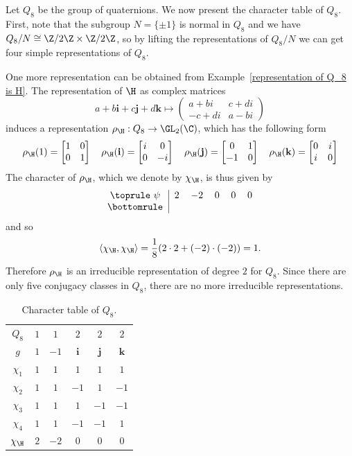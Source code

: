 \begin{example}\label{character table Q_8}
Let $Q_8$ be the group of quaternions. We now present the character table of $Q_8$. First, note that the subgroup $N=\{\pm 1\}$ is normal in $Q_8$ and we have $Q_8/N\cong\Z/2\Z\times\Z/2\Z$, so by lifting the representations of $Q_8/N$ we can get four simple representations of $Q_8$.\par
One more representation can be obtained from Example~\ref{representation of Q_8 is H}. The representation of $\H$ as complex matrices
\[a+b\mathbf{i}+c\mathbf{j}+d\mathbf{k}\mapsto\begin{pmatrix}
a+bi&c+di\\
-c+di&a-bi
\end{pmatrix}\]
induces a representation $\rho_{\H}:Q_8\to\GL_2(\C)$, which has the following form
\[\rho_{\H}(1)=\begin{bmatrix}
1&0\\
0&1
\end{bmatrix}\quad \rho_{\H}(\mathbf{i})=\begin{bmatrix}
i&0\\
0&-i
\end{bmatrix}\quad\rho_{\H}(\mathbf{j})=\begin{bmatrix}
0&1\\
-1&0
\end{bmatrix}\quad\rho_{\H}(\mathbf{k})=\begin{bmatrix}
0&i\\
i&0
\end{bmatrix}\]
The character of $\rho_{\H}$, which we denote by $\chi_{\H}$, is thus given by
\[\begin{tabular}{c|ccccc}
\toprule
$\psi$&$2$&$-2$&$0$&$0$&$0$\\
\bottomrule
\end{tabular}\]
and so
\[\langle\chi_{\H},\chi_{\H}\rangle=\frac{1}{8}(2\cdot 2+(-2)\cdot(-2))=1.\]
Therefore $\rho_{\H}$ is an irreducible representation of degree $2$ for $Q_8$. Since there are only five conjugacy classes in $Q_8$, there are no more irreducible representations.
\begin{table}[h]
\centering
\begin{tabular}{c|ccccc}
\toprule
$Q_8$&$1$&$1$&$2$&$2$&$2$\\
$g$&$1$&$-1$&$\mathbf{i}$&$\mathbf{j}$&$\mathbf{k}$\\
\midrule
$\chi_{1}$&$1$&$1$&$1$&$1$&$1$\\
$\chi_{2}$&$1$&$1$&$-1$&$1$&$-1$\\
$\chi_{3}$&$1$&$1$&$1$&$-1$&$-1$\\
$\chi_{4}$&$1$&$1$&$-1$&$-1$&$1$\\
$\chi_{\H}$&$2$&$-2$&$0$&$0$&$0$\\
\bottomrule
\end{tabular}
\caption{Character table of $Q_8$.}
\label{char table of Q_8}
\end{table}
\end{example}
